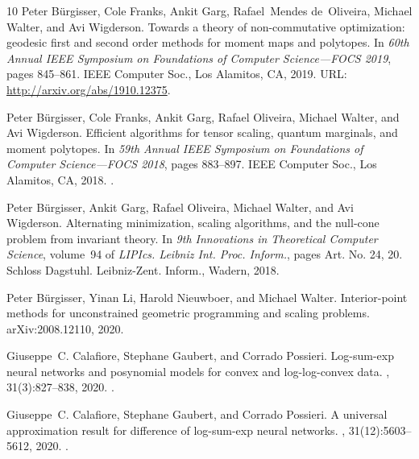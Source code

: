 \documentclass[10pt,a4paper]{article}
\theoremstyle{definition}
\numberwithin{equation}{section}
\begin{document}
\begin{thebibliography}{10}
Peter B{\"{u}}rgisser, Cole Franks, Ankit Garg, Rafael~Mendes de~Oliveira,
  Michael Walter, and Avi Wigderson.
\newblock Towards a theory of non-commutative optimization: geodesic first and
  second order methods for moment maps and polytopes.
\newblock In {\em 60th {A}nnual {IEEE} {S}ymposium on {F}oundations of
  {C}omputer {S}cience---{FOCS} 2019}, pages 845--861. IEEE Computer Soc., Los
  Alamitos, CA, 2019.
\newblock URL: \url{http://arxiv.org/abs/1910.12375}.

Peter B\"{u}rgisser, Cole Franks, Ankit Garg, Rafael Oliveira, Michael Walter,
  and Avi Wigderson.
\newblock Efficient algorithms for tensor scaling, quantum marginals, and
  moment polytopes.
\newblock In {\em 59th {A}nnual {IEEE} {S}ymposium on {F}oundations of
  {C}omputer {S}cience---{FOCS} 2018}, pages 883--897. IEEE Computer Soc., Los
  Alamitos, CA, 2018.
\newblock \href {https://doi.org/10.1109/FOCS.2018.00088}
  {}.

Peter B\"{u}rgisser, Ankit Garg, Rafael Oliveira, Michael Walter, and Avi
  Wigderson.
\newblock Alternating minimization, scaling algorithms, and the null-cone
  problem from invariant theory.
\newblock In {\em 9th {I}nnovations in {T}heoretical {C}omputer {S}cience},
  volume~94 of {\em LIPIcs. Leibniz Int. Proc. Inform.}, pages Art. No. 24, 20.
  Schloss Dagstuhl. Leibniz-Zent. Inform., Wadern, 2018.

Peter B\"{u}rgisser, Yinan Li, Harold Nieuwboer, and Michael Walter.
\newblock Interior-point methods for unconstrained geometric programming and
  scaling problems.
\newblock arXiv:2008.12110, 2020.

Giuseppe~C. Calafiore, Stephane Gaubert, and Corrado Possieri.
\newblock Log-sum-exp neural networks and posynomial models for convex and
  log-log-convex data.
,
  31(3):827--838, 2020.
\newblock \href {https://doi.org/10.1109/TNNLS.2019.2910417}
  {}.

Giuseppe~C. Calafiore, Stephane Gaubert, and Corrado Possieri.
\newblock A universal approximation result for difference of log-sum-exp neural
  networks.
,
  31(12):5603--5612, 2020.
\newblock \href {https://doi.org/10.1109/TNNLS.2020.2975051}
  {}.


\end{thebibliography}
\end{document}
